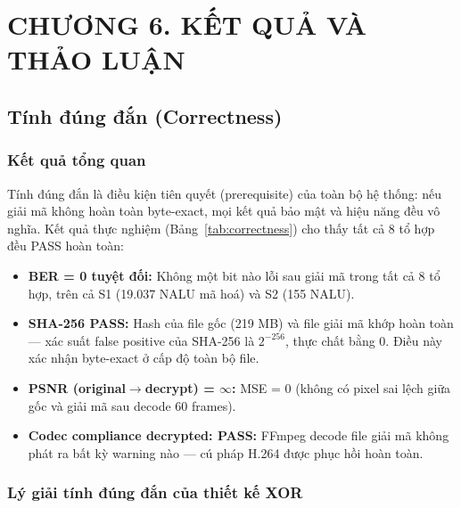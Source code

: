 \clearpage
{}
\section*{CHƯƠNG 6. KẾT QUẢ VÀ THẢO LUẬN}
\setcounter{section}{6}
\setcounter{subsection}{0}
\setcounter{figure}{0}
\setcounter{table}{0}
\setcounter{equation}{0}



\subsection{Tính đúng đắn (Correctness)}

\subsubsection{Kết quả tổng quan}

Tính đúng đắn là điều kiện tiên quyết (prerequisite) của toàn bộ hệ thống:
nếu giải mã không hoàn toàn byte-exact, mọi kết quả bảo mật và hiệu năng đều
vô nghĩa. Kết quả thực nghiệm (Bảng~\ref{tab:correctness}) cho thấy tất cả
8 tổ hợp đều PASS hoàn toàn:

\begin{itemize}
  \item \textbf{BER = 0 tuyệt đối:} Không một bit nào lỗi sau giải mã trong
        tất cả 8 tổ hợp, trên cả S1 (19.037 NALU mã hoá) và S2 (155 NALU).

  \item \textbf{SHA-256 PASS:} Hash của file gốc (219 MB) và file giải mã
        khớp hoàn toàn --- xác suất false positive của SHA-256 là $2^{-256}$,
        thực chất bằng 0. Điều này xác nhận byte-exact ở cấp độ toàn bộ file.

  \item \textbf{PSNR (original$\to$decrypt) = $\infty$:} MSE = 0 (không có
        pixel sai lệch giữa gốc và giải mã sau decode 60 frames).

  \item \textbf{Codec compliance decrypted: PASS:} FFmpeg decode file giải mã
        không phát ra bất kỳ warning nào --- cú pháp H.264 được phục hồi hoàn toàn.
\end{itemize}

\subsubsection{Lý giải tính đúng đắn của thiết kế XOR}

